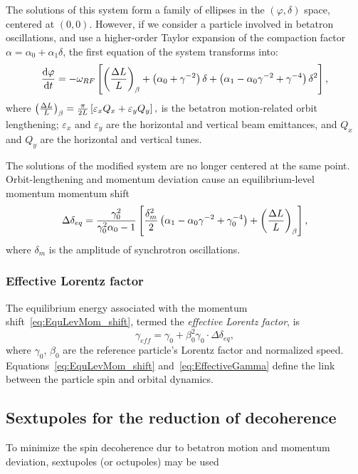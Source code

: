 \documentclass{article}
\begin{document}
The solutions of this system form a family of ellipses in the $(\varphi, \delta)$ space, centered at $(0,0)$. However, if we consider a particle involved in betatron oscillations, and use a higher-order Taylor expansion of the compaction factor $\alpha = \alpha_0 + \alpha_1\delta$, the first equation of the system transforms into:~\citep[p.~2579]{Senichev:IPAC13}
\[
\ddt{\varphi} = -\w_{RF} \bkt*{\bkt{\frac{\Delta L}{L}}_\beta + \bkt{\alpha_0 + \gamma^{-2}}\delta + \bkt{\alpha_1 - \alpha_0\gamma^{-2} + \gamma^{-4}}\delta^2},
\]
where $\bkt{\frac{\Delta L}{L}}_\beta = \frac{\pi}{2L}\bkt*{\varepsilon_xQ_x + \varepsilon_yQ_y},$ is the betatron motion-related orbit lengthening; $\varepsilon_x$ and $\varepsilon_y$ are the horizontal and vertical beam emittances, and $Q_x$ and $Q_y$ are the horizontal and vertical tunes.~\citep[p.~2580]{Senichev:IPAC13}

The solutions of the modified system are no longer centered at the same point. Orbit-lengthening and momentum deviation cause an equilibrium-level momentum momentum shift~\citep[p.~2581]{Senichev:IPAC13}
\begin{equation}\label{eq:EquLevMom_shift}
  \Delta\delta_{eq} = \frac{\gamma_0^2}{\gamma_0^2\alpha_0 - 1}\bkt*{\frac{\delta_m^2}{2}\bkt{\alpha_1 - \alpha_0\gamma^{-2} + \gamma_0^{-4}} + \bkt{\frac{\Delta L}{L}}_\beta},
\end{equation}
where $\delta_m$ is the amplitude of synchrotron oscillations.


\subsubsection{Effective Lorentz factor}
The equilibrium energy associated with the momentum shift~\eqref{eq:EquLevMom_shift}, termed the \emph{effective Lorentz factor}, is~\cite{Senichev:FDM}
\begin{equation}\label{eq:EffectiveGamma}
  \gamma_{eff} = \gamma_0 + \beta_0^2\gamma_0\cdot\Delta\delta_{eq},
\end{equation}
where $\gamma_0$, $\beta_0$ are the reference particle's Lorentz factor and normalized speed. Equations~\eqref{eq:EquLevMom_shift} and~\eqref{eq:EffectiveGamma} define the link between the particle spin and orbital dynamics.

\subsection{Sextupoles for the reduction of decoherence}\label{sec:Sextupole_decoherence_suppression}
To minimize the spin decoherence dur to betatron motion and momentum deviation, sextupoles (or octupoles) may be used~\citep[p.~212]{Eremey:Thesis}
\end{document}
